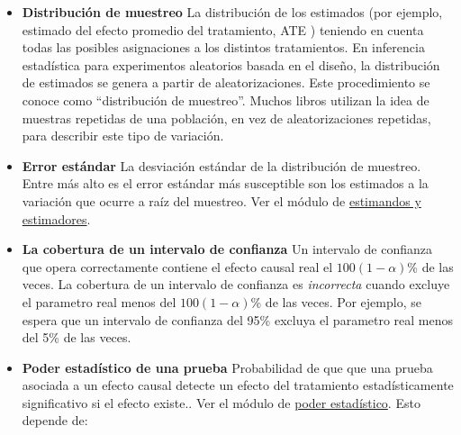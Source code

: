 \documentclass[12pt,spanish,]{book}
\begin{document}
\begin{itemize}
\item
  \textbf{Distribución de muestreo} La distribución de los estimados (por ejemplo, estimado del efecto promedio del tratamiento, ATE ) teniendo en cuenta todas las posibles asignaciones a los distintos tratamientos. En inferencia estadística para experimentos aleatorios basada en el diseño, la distribución de estimados se genera a partir de aleatorizaciones. Este procedimiento se conoce como ``distribución de muestreo''. Muchos libros utilizan la idea de muestras repetidas de una población, en vez de aleatorizaciones repetidas, para describir este tipo de variación.
\item
  \textbf{Error estándar} La desviación estándar de la distribución de muestreo. Entre más alto es el error estándar más susceptible son los estimados a la variación que ocurre a raíz del muestreo. Ver el módulo de \href{estimandos-y-estimadores.html}{estimandos y estimadores}.
\item
  \textbf{La cobertura de un intervalo de confianza} Un intervalo de confianza que opera correctamente contiene el efecto causal real el \(100 ( 1 - \alpha)\)\% de las veces. La cobertura de un intervalo de confianza es \emph{incorrecta} cuando excluye el parametro real menos del \(100 (1 - \alpha)\)\% de las veces. Por ejemplo, se espera que un intervalo de confianza del 95\% excluya el parametro real menos del
  5\% de las veces.
\item
  \textbf{Poder estadístico de una prueba} Probabilidad de que que una prueba asociada a un efecto causal detecte un efecto del tratamiento estadísticamente significativo si el efecto existe.. Ver el módulo de \href{poder-estadístico-y-diagnosticandos-del-diseño.html}{poder estadístico}. Esto depende de:


\end{itemize}
\end{document}
